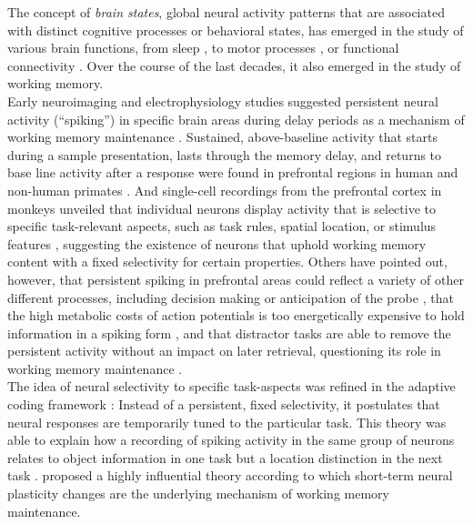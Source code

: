 The concept of \textit{brain states}, global neural activity patterns that are associated with distinct cognitive processes or behavioral states, has emerged in the study of various brain functions, from sleep \citep{lee2012neuromodulation}, to motor processes \citep{pfurtscheller2008short}, or functional connectivity \citep{finn2017can}.
Over the course of the last decades, it also emerged in the study of working memory. \\
Early neuroimaging and electrophysiology studies suggested persistent neural activity (``spiking'') in specific brain areas during delay periods as a mechanism of working memory maintenance \citep{goldman1995cellular}.
Sustained, above-baseline activity that starts during a sample presentation, lasts through the memory delay, and returns to base line activity after a response were found in prefrontal regions in human \citep[e.g.,][]{courtney1997transient} and non-human primates \citep[e.g.,][]{fuster1971neuron, funahashi1989mnemonic, miller1996neural}.
And single-cell recordings from the prefrontal cortex in monkeys unveiled that individual neurons display activity that is selective to specific task-relevant aspects, such as task rules, spatial location, or stimulus features \citep{white1999rule, wallis2001single}, suggesting the existence of neurons that uphold working memory content with a fixed selectivity for certain properties.
Others have pointed out, however, that persistent spiking in prefrontal areas could reflect a variety of other different processes, including decision making \citep{curtis2010beyond} or anticipation of the probe \citep{nobre2011attention}, that the high metabolic costs of action potentials is too energetically expensive to hold information in a spiking form \citep{attwell2001energy}, and that distractor tasks are able to remove the persistent activity without an impact on later retrieval, questioning its role in working memory maintenance \citep{larocque2013decoding, lewis2015neural}.\\
The idea of neural selectivity to specific task-aspects was refined in the adaptive coding framework \citep{duncan2001adaptive}:
Instead of a persistent, fixed selectivity, it postulates that neural responses are temporarily tuned to the particular task. This theory was able to explain how a recording of spiking activity in the same group of neurons relates to object information in one task but a location distinction in the next task \citep{duncan2001adaptive}.
\citet{mongillo2008synaptic} proposed a highly influential theory according to which short-term neural plasticity changes are the underlying mechanism of working memory maintenance.
